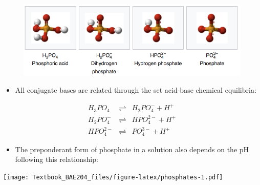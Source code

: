 \documentclass[]{book}
\providecommand{\tightlist}{%
  \setlength{\itemsep}{0pt}\setlength{\parskip}{0pt}}
\theoremstyle{definition}
\theoremstyle{definition}
\theoremstyle{definition}
\theoremstyle{remark}
\begin{document}
\begin{figure}
\centering
\includegraphics[width=1.00000\textwidth]{pictures/phosphate_conjugate_bases.png}
\caption{}
\end{figure}

\begin{itemize}
\tightlist
\item
  All conjugate bases are related through the set acid-base chemical
  equilibria:
\end{itemize}

\begin{align}
H_3PO_4  & \rightleftharpoons & H_2PO_4^- + H^+ \tag{$pK_A$ = 2.12}\\
H_2PO_4^- & \rightleftharpoons & HPO_4^{2-} + H^+ \tag{$pK_A$ = 7.21}\\
HPO_4^{2-}& \rightleftharpoons & PO_4^{3-} + H^+ \tag{$pK_A$ = 12.67}
\end{align}

\begin{itemize}
\tightlist
\item
  The preponderant form of phosphate in a solution also depends on the
  pH following this relationship:
\end{itemize}

\texttt{[image: Textbook\_BAE204\_files/figure-latex/phosphates-1.pdf]}
\end{document}
